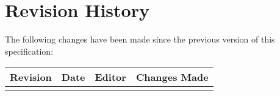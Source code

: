 \chapter{Revision History}
The following changes have been made since the previous version
of this specification:

\begin{DIFnomarkup}
\begin{longtable}{ | p{} | p{} | p{} | p{} | }
\hline
\textbf{Revision} & \textbf{Date} & \textbf{Editor} & \textbf{Changes Made} \\
\hline
\endhead

& & \\
\hline
\end{longtable}
\end{DIFnomarkup}
